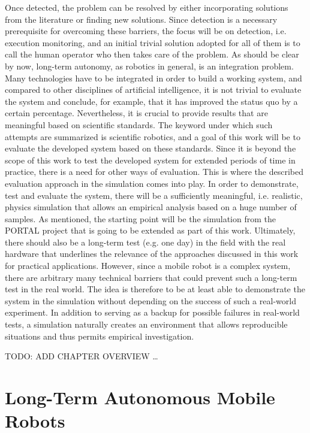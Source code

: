 \documentclass[english, master, utf8]{base/thesis_KBS}
\begin{document}
Once detected, the problem can be resolved by either incorporating solutions from the literature or finding new solutions.
Since detection is a necessary prerequisite for overcoming these barriers, the focus will be on detection, i.e. execution monitoring,
and an initial trivial solution adopted for all of them is to call the human operator who then takes care of the problem.\newline
As should be clear by now, long-term autonomy, as robotics in general, is an integration problem. Many technologies have to be integrated in order to build a working system, 
and compared to other disciplines of artificial intelligence, it is not trivial to evaluate the system and conclude, for example, that it has improved the status quo by a 
certain percentage. Nevertheless, it is crucial to provide results that are meaningful based on scientific standards. 
The keyword under which such attempts are summarized is scientific robotics, and a goal of this work will be to evaluate the developed system based on these standards.
Since it is beyond the scope of this work to test the developed system for extended periods of time in practice, there is a need for other ways of evaluation.
This is where the described evaluation approach in the simulation comes into play. In order to demonstrate, test and evaluate the system, there will be a sufficiently meaningful, 
i.e. realistic, physics simulation that allows an empirical analysis based on a huge number of samples. As mentioned, the starting point will be the simulation from the 
PORTAL project that is going to be extended as part of this work. Ultimately, there should also be a long-term test (e.g. one day) in the field with the real hardware that 
underlines the relevance of the approaches discussed in this work for practical applications. However, since a mobile robot is a complex system, there are arbitrary 
many technical barriers that could prevent such a long-term test in the real world. The idea is therefore to be at least able to demonstrate the system in the simulation
without depending on the success of such a real-world experiment. In addition to serving as a backup for possible failures in real-world tests,
a simulation naturally creates an environment that allows reproducible situations and thus permits empirical investigation.\newline

TODO: ADD CHAPTER OVERVIEW \dots\newline

\chapter{Long-Term Autonomous Mobile Robots}
\end{document}
